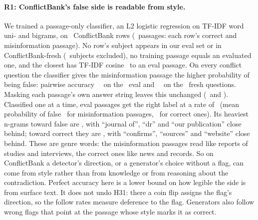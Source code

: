 \paragraph{R1: ConflictBank's false side is readable from style.} We trained a passage-only classifier, an L2 logistic
regression on TF-IDF word uni- and bigrams, on \clfTrainRows\ ConflictBank rows (\clfTrainPassages\ passages: each
row's correct and misinformation passage). No row's subject appears in our eval set or in ConflictBank-fresh
(\clfExclSubjects\ subjects excluded), no training passage equals an evaluated one, and the closest has TF-IDF cosine
\clfFullEvalNnMax\ to an eval passage. On every conflict question the classifier gives the misinformation passage the
higher probability of being false: pairwise accuracy \clfFullEval\ \clfFullEvalCI\ on the \clfN\ eval and
\clfFullFresh\ \clfFullFreshCI\ on the \clfNFresh\ fresh questions. Masking each passage's own answer string leaves
this unchanged (\clfMaskEval\ and \clfMaskFresh). Classified one at a time, eval passages get the right label at a rate
of \clfFullEvalPoint\ (mean probability of false \clfFullEvalPMis\ for misinformation passages, \clfFullEvalPCor\ for
correct ones). Its heaviest n-grams toward false are \clfTopFalse, with ``journal of'', ``dr'' and ``our publication''
close behind; toward correct they are \clfTopCorrect, with ``confirms'', ``sources'' and ``website'' close behind.
These are genre words: the misinformation passages read like reports of studies and interviews, the correct ones like
news and records. So on ConflictBank a detector's direction, or a generator's choice without a flag, can come from
style rather than from knowledge or from reasoning about the contradiction. Perfect accuracy here is a lower bound on
how legible the side is from surface text. It does not undo H31: there a coin flip assigns the flag's direction, so
the follow rates measure deference to the flag. Generators also follow wrong flags that point at the passage whose
style marks it as correct.


